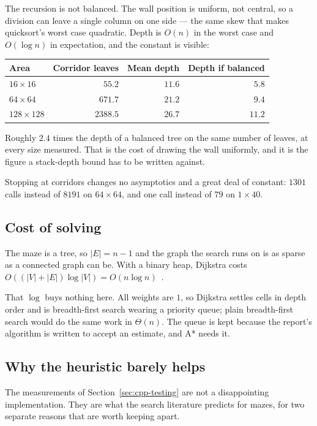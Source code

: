 The recursion is not balanced. The wall position is uniform, not central, so a
division can leave a single column on one side --- the same skew that makes
quicksort's worst case quadratic. Depth is $O(n)$ in the worst case and
$O(\log n)$ in expectation, and the constant is visible:

\begin{center}
\begin{tabular}{@{}lrrr@{}}
  \toprule
  Area & Corridor leaves & Mean depth & Depth if balanced \\
  \midrule
  $16\times16$   & $55.2$   & $11.6$ & $5.8$ \\
  $64\times64$   & $671.7$  & $21.2$ & $9.4$ \\
  $128\times128$ & $2388.5$ & $26.7$ & $11.2$ \\
  \bottomrule
\end{tabular}
\end{center}

Roughly $2.4$ times the depth of a balanced tree on the same number of leaves,
at every size measured. That is the cost of drawing the wall uniformly, and it
is the figure a stack-depth bound has to be written against.

Stopping at corridors changes no asymptotics and a great deal of constant:
$1301$ calls instead of $8191$ on $64\times64$, and one call instead of $79$ on
$1\times40$.

\subsection{Cost of solving}

The maze is a tree, so $|E|=n-1$ and the graph the search runs on is as sparse
as a connected graph can be. With a binary heap, Dijkstra costs
$O((|V|+|E|)\log|V|)=O(n\log n)$~\cite[Ch.~22]{cormen2022introduction}.

That $\log$ buys nothing here. All weights are $1$, so Dijkstra settles cells in
depth order and is breadth-first search wearing a priority queue; plain
breadth-first search would do the same work in $\Theta(n)$. The queue is kept
because the report's algorithm is written to accept an estimate, and A* needs
it.

\subsection{Why the heuristic barely helps}

The measurements of Section~\ref{sec:cpp-testing} are not a disappointing
implementation. They are what the search literature predicts for mazes, for two
separate reasons that are worth keeping apart.

